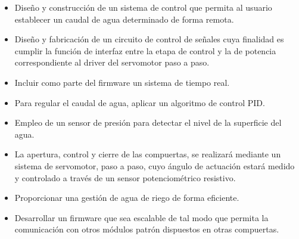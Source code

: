 \begin{itemize}
\item Diseño y construcción de  un sistema de control que permita al usuario establecer un caudal de agua determinado de forma remota.

\item Diseño y fabricación de un circuito de control de señales cuya finalidad es cumplir la función de interfaz entre la etapa de control y la de potencia correspondiente al driver del servomotor paso a paso. 
\item Incluir como parte del firmware un sistema de tiempo real.  
\item Para regular el caudal de agua, aplicar un algoritmo de control PID.
\item Empleo de un sensor de presión para detectar el nivel de la superficie del agua.
\item La apertura, control y cierre de las compuertas, se realizará mediante un sistema de servomotor, paso a paso, cuyo ángulo de actuación estará medido y controlado a través de un sensor potenciométrico resistivo.  
\item Proporcionar una gestión de agua de riego de forma eficiente.
\item Desarrollar un firmware que sea escalable de tal modo que permita la comunicación con otros módulos patrón dispuestos en otras compuertas. 
\end{itemize}

